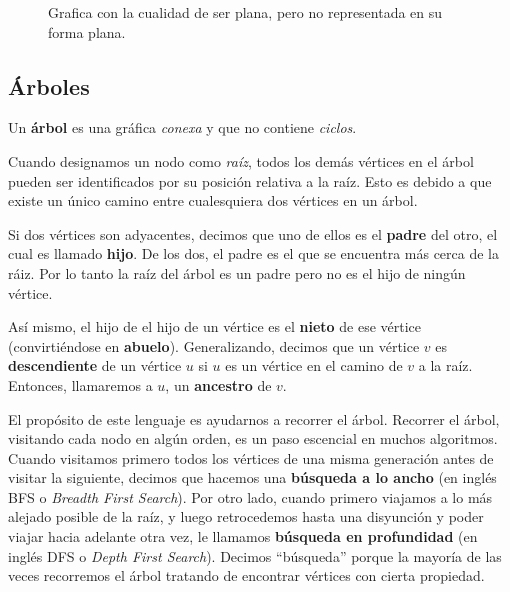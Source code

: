 \begin{figure}
  \caption{Grafica con la cualidad de ser plana, pero no representada en su forma plana.}
\end{figure}

\subsection{\'Arboles}
\label{section:arboles}

\begin{definition}[\'Arbol]
Un \textbf{\'arbol} es una gr\'afica \emph{conexa} y que no contiene \emph{ciclos}.
\end{definition}

Cuando designamos un nodo como \emph{ra\'iz}, todos los dem\'as v\'ertices en el \'arbol pueden ser identificados por su posici\'on relativa a la ra\'iz. Esto es debido a que existe un \'unico camino entre cualesquiera dos v\'ertices en un \'arbol.

Si dos vértices son adyacentes, decimos que uno de ellos es el \textbf{padre} del otro, el cual es llamado \textbf{hijo}. De los dos, el padre es el que se encuentra m\'as cerca de la r\'aiz. Por lo tanto la ra\'iz del \'arbol es un padre pero no es el hijo de ning\'un v\'ertice.

As\'i mismo, el hijo de el hijo de un v\'ertice es el \textbf{nieto} de ese v\'ertice (convirti\'endose en \textbf{abuelo}). Generalizando, decimos que un v\'ertice $v$ es \textbf{descendiente} de un v\'ertice $u$ si $u$ es un v\'ertice en el camino de $v$ a la ra\'iz. Entonces, llamaremos a $u$, un \textbf{ancestro} de $v$.

El propósito de este lenguaje es ayudarnos a recorrer el árbol. Recorrer el árbol, visitando cada nodo en algún orden, es un paso escencial en muchos algoritmos. Cuando visitamos primero todos los vértices de una misma generación antes de visitar la siguiente, decimos que hacemos una \textbf{b\'usqueda a lo ancho} (en inglés BFS o \textit{Breadth First Search}). Por otro lado, cuando primero viajamos a lo más alejado posible de la raíz, y luego retrocedemos hasta una disyunción y poder viajar hacia adelante otra vez, le llamamos \textbf{b\'usqueda en profundidad} (en inglés DFS o \textit{Depth First Search}). Decimos ``b\'usqueda'' porque la mayoría de las veces recorremos el árbol tratando de encontrar vértices con cierta propiedad.

